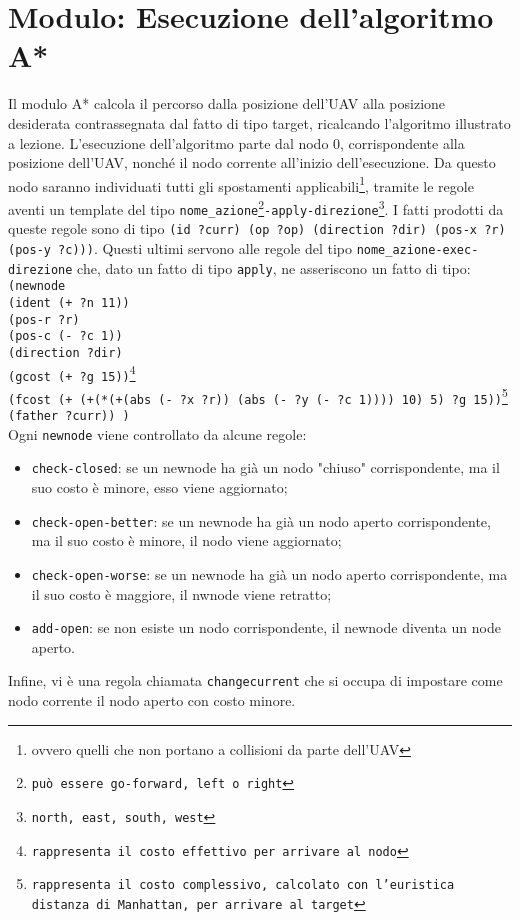 \section{Modulo: Esecuzione dell'algoritmo A*} \label{sec:safe-astar}
Il modulo A* calcola il percorso dalla posizione dell'UAV alla posizione desiderata contrassegnata dal fatto di tipo target, ricalcando l'algoritmo illustrato a lezione.
L'esecuzione dell'algoritmo parte dal nodo 0, corrispondente alla posizione dell'UAV, nonché il nodo corrente all'inizio dell'esecuzione. Da questo nodo saranno individuati tutti gli spostamenti applicabili\footnote{ovvero quelli che non portano a collisioni da parte dell'UAV}, tramite le regole aventi un template del tipo \texttt{nome\_azione\footnote{può essere go-forward, left o right}-apply-direzione\footnote{north, east, south, west}}. I fatti prodotti da queste regole sono di tipo \texttt{(id ?curr) (op ?op) (direction ?dir) (pos-x ?r) (pos-y ?c)))}. Questi ultimi servono alle regole del tipo \texttt{nome\_azione-exec-direzione} che, dato un fatto di tipo \texttt{apply}, ne asseriscono un fatto di tipo:\\ \texttt{(newnode\\
            (ident (+ ?n 11))\\
            (pos-r ?r)\\
            (pos-c (- ?c 1))\\
            (direction ?dir)\\
            (gcost (+ ?g 15))\footnote{rappresenta il costo effettivo per arrivare al nodo}\\
            (fcost (+ (+(*(+(abs (- ?x ?r)) (abs (- ?y (- ?c 1)))) 10) 5) ?g 15))\footnote{rappresenta il costo complessivo, calcolato con l'euristica distanza di Manhattan, per arrivare al target}\\
            (father ?curr))
)}\\
Ogni \texttt{newnode} viene controllato da alcune regole:
\begin{itemize}
	\item \texttt{check-closed}: se un newnode ha già un nodo "chiuso" corrispondente, ma il suo costo è minore, esso viene aggiornato;
	\item \texttt{check-open-better}: se un newnode ha già un nodo aperto corrispondente, ma il suo costo è minore, il nodo viene aggiornato;
	\item \texttt{check-open-worse}: se un newnode ha già un nodo aperto corrispondente, ma il suo costo è maggiore, il nwnode viene retratto;
	\item \texttt{add-open}: se non esiste un nodo corrispondente, il newnode diventa un node aperto.
\end{itemize}
Infine, vi è una regola chiamata \texttt{changecurrent} che si occupa di impostare come nodo corrente il nodo aperto con costo minore.


